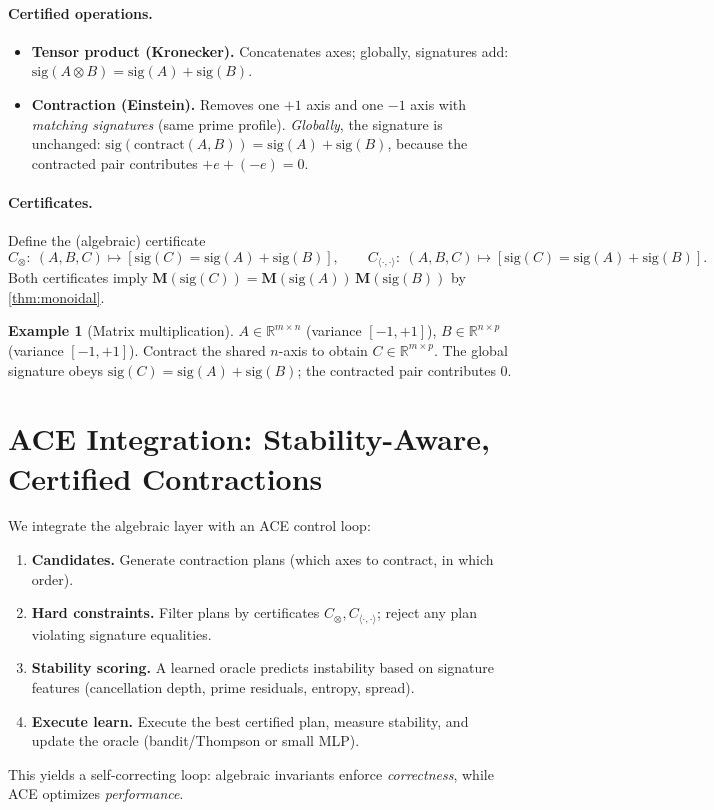 \documentclass[11pt]{article}
\theoremstyle{plain}
\theoremstyle{definition}
\newtheorem{example}[theorem]{Example}
\newcommand{\R}{\mathbb{R}}
\newcommand{\M}{\mathbf{M}} %
\begin{document}
\paragraph{Certified operations.}
\begin{itemize}[leftmargin=*]
  \item \textbf{Tensor product (Kronecker).} Concatenates axes; globally, signatures add: $\mathrm{sig}(A\otimes B)=\mathrm{sig}(A)+\mathrm{sig}(B)$.
  \item \textbf{Contraction (Einstein).} Removes one $+1$ axis and one $-1$ axis with \emph{matching signatures} (same prime profile). \emph{Globally}, the signature is unchanged:
  $\mathrm{sig}(\mathrm{contract}(A,B))=\mathrm{sig}(A)+\mathrm{sig}(B)$, because the contracted pair contributes $+e+(-e)=0$.
\end{itemize}

\paragraph{Certificates.} Define the (algebraic) certificate
\[
  C_{\otimes}:\ (A,B,C)\mapsto [\mathrm{sig}(C)=\mathrm{sig}(A)+\mathrm{sig}(B)],\qquad
  C_{\langle\cdot,\cdot\rangle}:\ (A,B,C)\mapsto [\mathrm{sig}(C)=\mathrm{sig}(A)+\mathrm{sig}(B)].
\]
Both certificates imply $\M(\mathrm{sig}(C))=\M(\mathrm{sig}(A))\,\M(\mathrm{sig}(B))$ by \cref{thm:monoidal}.

\begin{example}[Matrix multiplication]
$A\in\R^{m\times n}$ (variance $[-1,+1]$), $B\in\R^{n\times p}$ (variance $[-1,+1]$). Contract the shared $n$-axis to obtain $C\in\R^{m\times p}$. The global signature obeys $\mathrm{sig}(C)=\mathrm{sig}(A)+\mathrm{sig}(B)$; the contracted pair contributes $0$.
\end{example}

\section{ACE Integration: Stability-Aware, Certified Contractions}
\label{sec:ace}
We integrate the algebraic layer with an ACE control loop:
\begin{enumerate}[leftmargin=*]
  \item \textbf{Candidates.} Generate contraction plans (which axes to contract, in which order).
  \item \textbf{Hard constraints.} Filter plans by certificates $C_{\otimes},C_{\langle\cdot,\cdot\rangle}$; reject any plan violating signature equalities.
  \item \textbf{Stability scoring.} A learned oracle predicts instability based on signature features (cancellation depth, prime residuals, entropy, spread).
  \item \textbf{Execute \/ learn.} Execute the best certified plan, measure stability, and update the oracle (bandit/Thompson or small MLP).
\end{enumerate}
This yields a self-correcting loop: algebraic invariants enforce \emph{correctness}, while ACE optimizes \emph{performance}.
\end{document}
